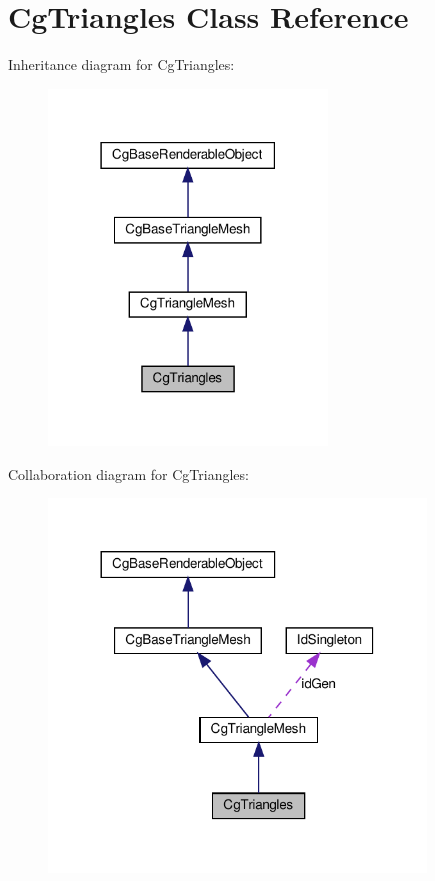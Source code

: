 \hypertarget{class_cg_triangles}{}\section{Cg\+Triangles Class Reference}
\label{class_cg_triangles}


Inheritance diagram for Cg\+Triangles\+:
\nopagebreak
\begin{figure}[H]
\begin{center}
\leavevmode
\includegraphics[width=210pt]{class_cg_triangles__inherit__graph}
\end{center}
\end{figure}


Collaboration diagram for Cg\+Triangles\+:
\nopagebreak
\begin{figure}[H]
\begin{center}
\leavevmode
\includegraphics[width=284pt]{class_cg_triangles__coll__graph}
\end{center}
\end{figure}
